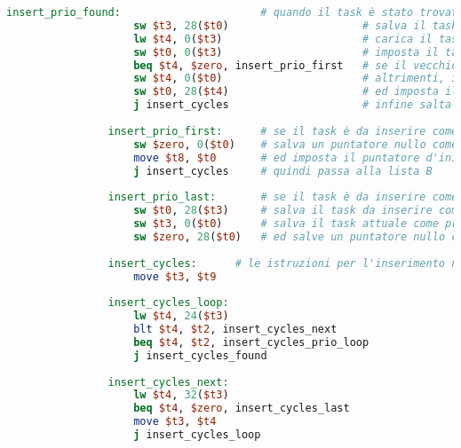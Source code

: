\begin{center}
\begin{lstlisting}[language=mips, gobble=14, stepnumber=1]
                insert_prio_found:                      # quando il task è stato trovato
                    sw $t3, 28($t0)                     # salva il task attuale come prossimo del task da inserire
                    lw $t4, 0($t3)                      # carica il task precedente al task attuale
                    sw $t0, 0($t3)                      # imposta il task da inserire come nuovo precedente del task attuale
                    beq $t4, $zero, insert_prio_first   # se il vecchio precedente è nullo, allora il task è da inserire come primo della lista
                    sw $t4, 0($t0)                      # altrimenti, imposta il task precedente al task attuale come precedente del task da inserire
                    sw $t0, 28($t4)                     # ed imposta il task da inserire come successivo del precedente del task attuale
                    j insert_cycles                     # infine salta alle istruzioni per l'inserimento nella lista B
                    
                insert_prio_first:      # se il task è da inserire come primo della lista
                    sw $zero, 0($t0)    # salva un puntatore nullo come precedente del task da inserire
                    move $t8, $t0       # ed imposta il puntatore d'inizio della lista A al task da inserire
                    j insert_cycles     # quindi passa alla lista B
                    
                insert_prio_last:       # se il task è da inserire come ultimo della lista
                    sw $t0, 28($t3)     # salva il task da inserire come successivo del task attuale
                    sw $t3, 0($t0)      # salva il task attuale come precedente del task da inserire
                    sw $zero, 28($t0)   # ed salve un puntatore nullo come successivo del task da inserire
                    
                insert_cycles:      # le istruzioni per l'inserimento nella lista B sono speculari a quelle per la lista A
                    move $t3, $t9
                    
                insert_cycles_loop:
                    lw $t4, 24($t3)
                    blt $t4, $t2, insert_cycles_next
                    beq $t4, $t2, insert_cycles_prio_loop
                    j insert_cycles_found
                    
                insert_cycles_next:
                    lw $t4, 32($t3)
                    beq $t4, $zero, insert_cycles_last
                    move $t3, $t4
                    j insert_cycles_loop
                    

\end{lstlisting}
\end{center}

